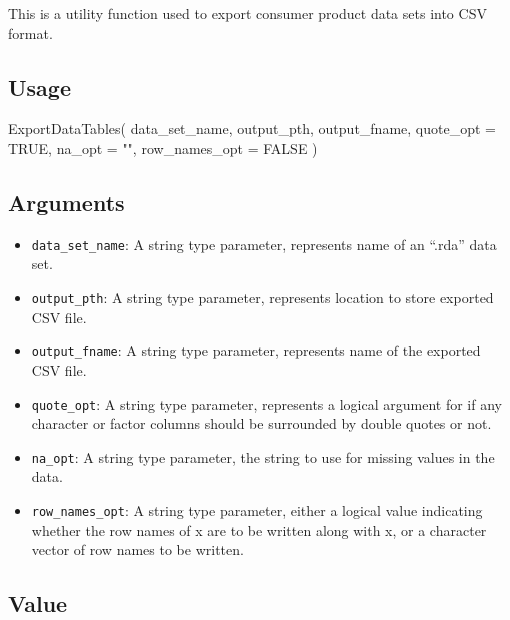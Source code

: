 \documentclass[
]{article}
\newenvironment{Shaded}{\begin{snugshade}}{\end{snugshade}}
\newcommand{\AttributeTok}[1]{\textcolor[rgb]{0.77,0.63,0.00}{#1}}
\newcommand{\ConstantTok}[1]{\textcolor[rgb]{0.00,0.00,0.00}{#1}}
\newcommand{\FunctionTok}[1]{\textcolor[rgb]{0.00,0.00,0.00}{#1}}
\newcommand{\NormalTok}[1]{#1}
\newcommand{\StringTok}[1]{\textcolor[rgb]{0.31,0.60,0.02}{#1}}
\providecommand{\tightlist}{%
  \setlength{\itemsep}{0pt}\setlength{\parskip}{0pt}}
\begin{document}
This is a utility function used to export consumer product data sets
into CSV format.

\hypertarget{usage-20}{%
\subsection{Usage}\label{usage-20}}

\begin{Shaded}
\begin{Highlighting}[]
\FunctionTok{ExportDataTables}\NormalTok{(}
\NormalTok{  data\_set\_name,}
\NormalTok{  output\_pth,}
\NormalTok{  output\_fname,}
  \AttributeTok{quote\_opt =} \ConstantTok{TRUE}\NormalTok{,}
  \AttributeTok{na\_opt =} \StringTok{""}\NormalTok{,}
  \AttributeTok{row\_names\_opt =} \ConstantTok{FALSE}
\NormalTok{)}
\end{Highlighting}
\end{Shaded}

\hypertarget{arguments-17}{%
\subsection{Arguments}\label{arguments-17}}

\begin{itemize}
\tightlist
\item
  \texttt{data\_set\_name}: A string type parameter, represents name of
  an ``.rda'' data set.
\item
  \texttt{output\_pth}: A string type parameter, represents location to
  store exported CSV file.
\item
  \texttt{output\_fname}: A string type parameter, represents name of
  the exported CSV file.
\item
  \texttt{quote\_opt}: A string type parameter, represents a logical
  argument for if any character or factor columns should be surrounded
  by double quotes or not.
\item
  \texttt{na\_opt}: A string type parameter, the string to use for
  missing values in the data.
\item
  \texttt{row\_names\_opt}: A string type parameter, either a logical
  value indicating whether the row names of x are to be written along
  with x, or a character vector of row names to be written.
\end{itemize}

\hypertarget{value-15}{%
\subsection{Value}\label{value-15}}
\end{document}
